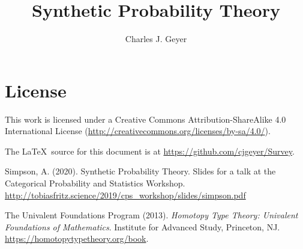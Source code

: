 \documentclass[11pt]{article}
\begin{document}
\title{Synthetic Probability Theory}
\author{Charles J. Geyer}
\maketitle

\section{License}

This work is licensed under a Creative Commons
Attribution-ShareAlike 4.0 International License
(\url{http://creativecommons.org/licenses/by-sa/4.0/}).

The \LaTeX\ source for this document is
at \url{https://github.com/cjgeyer/Survey}.

\begin{thebibliography}{}

Simpson, A. (2020).
\newblock Synthetic Probability Theory.
\newblock Slides for a talk at the Categorical Probability and Statistics
    Workshop.
\newblock \url{http://tobiasfritz.science/2019/cps_workshop/slides/simpson.pdf}

The Univalent Foundations Program (2013).
\newblock \emph{Homotopy Type Theory: Univalent Foundations of Mathematics}.
\newblock Institute for Advanced Study, Princeton, NJ.
\newblock \url{https://homotopytypetheory.org/book}.

\end{thebibliography}
\end{document}
